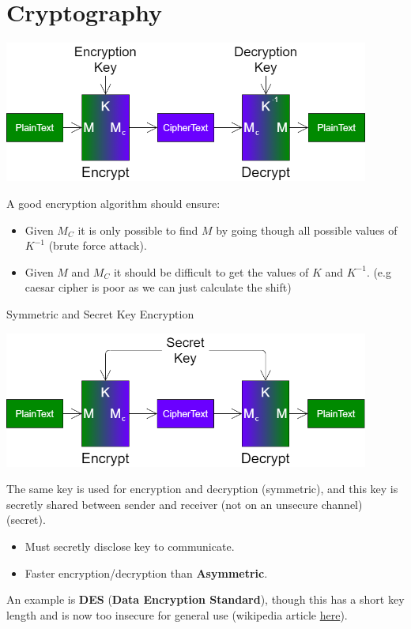 \section{Cryptography}
\begin{center}\includegraphics[width=0.9\textwidth]{network_security/images/cryptography.png}\end{center}
A good encryption algorithm should ensure:
\begin{itemize}
    \setlength\itemsep{0em}
    \item Given $M_C$ it is only possible to find $M$ by going though all possible values of $K^{-1}$ (brute force attack).
    \item Given $M$ and $M_C$ it should be difficult to get the values of $K$ and $K^{-1}$. (e.g caesar cipher is poor as we can just calculate the shift)
\end{itemize}
\begin{definitionbox}{Symmetric and Secret Key Encryption}
    \begin{center}\includegraphics[width=0.9\textwidth]{network_security/images/cryptography symmetric.png}\end{center}
    The same key is used for encryption and decryption (symmetric), and this key is secretly shared between sender and receiver (not on an unsecure channel) (secret).
    \begin{itemize}
        \setlength\itemsep{0em}
        \item Must secretly disclose key to communicate.
        \item Faster encryption/decryption than \textbf{Asymmetric}.
    \end{itemize}
    An example is \textbf{DES} (\textbf{Data Encryption Standard}), though this has a short key length and is now too insecure for general use (wikipedia article \href{https://en.wikipedia.org/wiki/Data_Encryption_Standard}{here}).
\end{definitionbox}

